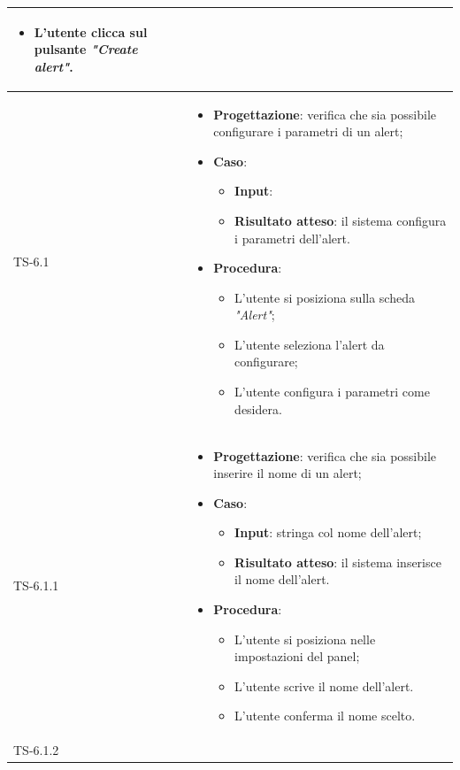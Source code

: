 \begin{longtable}{|C{2.5cm}|C{13cm}|}
\begin{itemize}
\begin{itemize}
		\item L'utente clicca sul pulsante \emph{"Create alert"}.
	\end{itemize} 
\end{itemize}
	 \\
	\hline
	{TS-6.1} & 
\begin{itemize}
	\item \textbf{Progettazione}: verifica che sia possibile configurare i
	parametri di un alert;
	\item \textbf{Caso}: 
	\begin{itemize}
		\item \textbf{Input}: 
		\item \textbf{Risultato atteso}: il sistema configura i parametri dell'alert.
	\end{itemize}
	\item \textbf{Procedura}:
	\begin{itemize}
		\item L'utente si posiziona sulla scheda \emph{"Alert"};
		\item L'utente seleziona l'alert da configurare;
		\item L'utente configura i parametri come desidera.
	\end{itemize} 
\end{itemize}
	 \\
	\hline
	{TS-6.1.1} &
\begin{itemize}
	\item \textbf{Progettazione}: verifica che sia possibile inserire il nome
	di un alert;
	\item \textbf{Caso}: 
	\begin{itemize}
		\item \textbf{Input}: stringa col nome dell'alert;
		\item \textbf{Risultato atteso}: il sistema inserisce il nome dell'alert.
	\end{itemize}
	\item \textbf{Procedura}:
	\begin{itemize}
		\item L'utente si posiziona nelle impostazioni del panel;
		\item L'utente scrive il nome dell'alert.
		\item L'utente conferma il nome scelto.
	\end{itemize} 
\end{itemize}
	  \\
	\hline
	{TS-6.1.2} & 
\begin{itemize}

\end{itemize}
\end{longtable}
